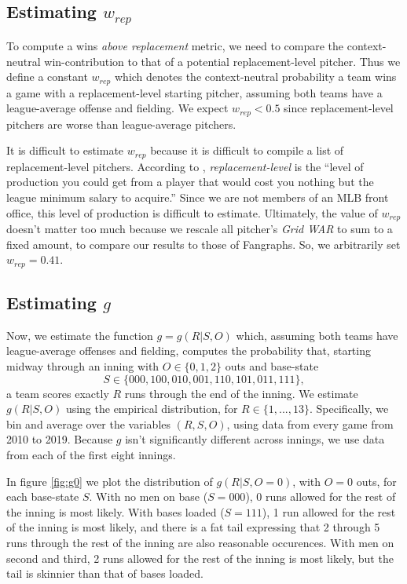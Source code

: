 \documentclass[12pt]{article}
\begin{document}
\subsection{Estimating $w_{rep}$}

To compute a wins \textit{above replacement} metric, we need to compare the context-neutral win-contribution to that of a potential replacement-level pitcher. Thus we define a constant $w_{rep}$ which denotes the context-neutral probability a team wins a game with a replacement-level starting pitcher, assuming both teams have a league-average offense and fielding. We expect $w_{rep} < 0.5$ since replacement-level pitchers are worse than league-average pitchers. 

It is difficult to estimate $w_{rep}$ because it is difficult to compile a list of replacement-level pitchers. According to \citet{ReplacementLevel}, \textit{replacement-level} is the ``level of production you could get from a player that would cost you nothing but the league minimum salary to acquire.'' Since we are not members of an MLB front office, this level of production is difficult to estimate. Ultimately, the value of $w_{rep}$ doesn't matter too much because we rescale all pitcher's \textit{Grid WAR} to sum to a fixed amount, to compare our results to those of Fangraphs. So, we arbitrarily set $w_{rep} = 0.41$. 

\subsection{Estimating $g$}

Now, we estimate the function $g=g(R|S,O)$ which, assuming both teams have league-average offenses and fielding, computes the probability that, starting midway through an inning with $O \in \{0,1,2\}$ outs and base-state 
$$S \in \{000,100,010,001,110,101,011,111\},$$
a team scores exactly $R$ runs through the end of the inning. We estimate $g(R|S,O)$ using the empirical distribution, for $R \in \{1,...,13\}$. Specifically, we bin and average over the variables $(R,S,O)$, using data from every game from 2010 to 2019. Because $g$ isn't significantly different across innings, we use data from each of the first eight innings.

In figure \ref{fig:g0} we plot the distribution of $g(R|S,O=0)$, with $O=0$ outs, for each base-state $S$. With no men on base ($S=000$), 0 runs allowed for the rest of the inning is most likely. With bases loaded ($S=111$), 1 run allowed for the rest of the inning is most likely, and there is a fat tail expressing that 2 through 5 runs through the rest of the inning are also reasonable occurences. With men on second and third, 2 runs allowed for the rest of the inning is most likely, but the tail is skinnier than that of bases loaded. 
\end{document}
